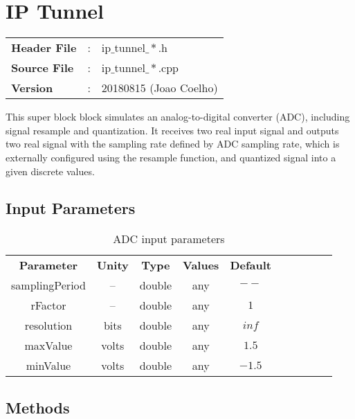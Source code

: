 \clearpage

\section{IP Tunnel}

\begin{tcolorbox}	
	\begin{tabular}{p{2.75cm} p{0.2cm} p{10.5cm}} 	
		\textbf{Header File}   &:& ip$\_$tunnel$\_*$.h \\
		\textbf{Source File}   &:& ip$\_$tunnel$\_*$.cpp \\
        \textbf{Version}       &:& 20180815 (Joao Coelho) \\
	\end{tabular}
\end{tcolorbox}

This super block block simulates an analog-to-digital converter (ADC), including signal resample and quantization. It receives two real input signal and outputs two real signal with the sampling rate defined by ADC sampling rate, which is externally configured using the resample function, and quantized signal into a given discrete values.

\subsection*{Input Parameters}

\begin{table}[h]
	\centering
	\begin{tabular}{|c|c|c|c|c|c|cccc}
		\cline{1-4}
		\textbf{Parameter} & \textbf{Unity} & \textbf{Type} & \textbf{Values} &   \textbf{Default}& \\ \cline{1-5}
        samplingPeriod & -- & double & any & $--$ \\ \cline{1-5}
        rFactor       & --    & double & any & $1$ \\ \cline{1-5}	
		resolution & bits  & double & any & $inf$ \\ \cline{1-5}	
        maxValue   & volts & double & any & $1.5$ \\ \cline{1-5}	
        minValue   & volts & double & any    & $-1.5$ \\ \cline{1-5}	
	\end{tabular}
	\caption{ADC input parameters}
	\label{table:ADC_in_par}
\end{table}

\subsection*{Methods}


